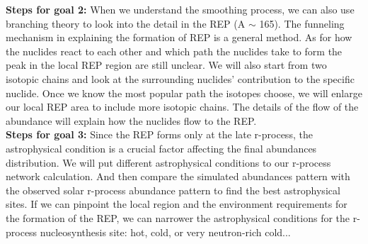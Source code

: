 \documentclass[aps,prl,preprint,groupedaddress]{revtex4}
\begin{document}
\textbf{Steps for goal 2:} 
When we understand the smoothing process, we can also use branching theory to look into the detail in the REP (A $\sim$ 165). The funneling mechanism in explaining the formation of REP is a general method. As for how the nuclides react to each other and which path the nuclides take to form the peak in the local REP region are still unclear. We will also start from two isotopic chains and look at the surrounding nuclides' contribution to the specific nuclide. Once we know the most popular path the isotopes choose, we will enlarge our local REP area to include more isotopic chains. The details of the flow of the abundance will explain how the nuclides flow to the REP.\\

\textbf{Steps for goal 3:} 
Since the REP forms only at the late r-process, the astrophysical condition is a crucial factor affecting the final abundances distribution. We will put different astrophysical conditions to our r-process network calculation. And then compare the simulated abundances pattern with the observed solar r-process abundance pattern to find the best astrophysical sites. If we can pinpoint the local region and the environment requirements for the formation of the REP, we can narrower the astrophysical conditions for the r-process nucleosynthesis site: hot, cold, or very neutron-rich cold...\\



\end{document}

